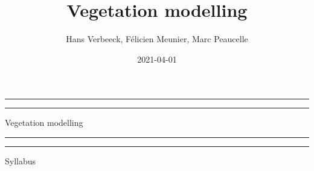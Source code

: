 \documentclass[12pt,oneside]{book}
\title{Vegetation modelling}
\author{Hans Verbeeck, Félicien Meunier, Marc Peaucelle}
\date{2021-04-01}
\begin{document}
\maketitle

\newcommand{\plogo}{\fbox{$\mathcal{PL}$}} %
\frontmatter


\begin{titlepage} %

	\centering %
	
	\scshape %
	
	\vspace*{\baselineskip} %
	
	
	\vspace{12\baselineskip}
	
	\rule{\textwidth}{1.6pt}\vspace*{-\baselineskip}\vspace*{2pt} %
	\rule{\textwidth}{0.4pt} %
	
	\vspace{0.75\baselineskip} %
	
	{\LARGE Vegetation modelling\\} %
	
	\vspace{0.75\baselineskip} %
	
	\rule{\textwidth}{0.4pt}\vspace*{-\baselineskip}\vspace{3.2pt} %
	\rule{\textwidth}{1.6pt} %
	
	\vspace{2\baselineskip} %
	
	
	Syllabus %
	
	\vspace*{3\baselineskip} %
	
	

\end{titlepage}
\end{document}
